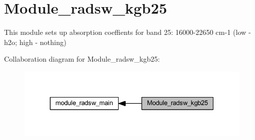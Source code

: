 \hypertarget{group__module__radsw__kgb25}{}\section{Module\+\_\+radsw\+\_\+kgb25}
\label{group__module__radsw__kgb25}


This module sets up absorption coeffients for band 25\+: 16000-\/22650 cm-\/1 (low -\/ h2o; high -\/ nothing)  


Collaboration diagram for Module\+\_\+radsw\+\_\+kgb25\+:\nopagebreak
\begin{figure}[H]
\begin{center}
\leavevmode
\includegraphics[width=331pt]{group__module__radsw__kgb25}
\end{center}
\end{figure}
